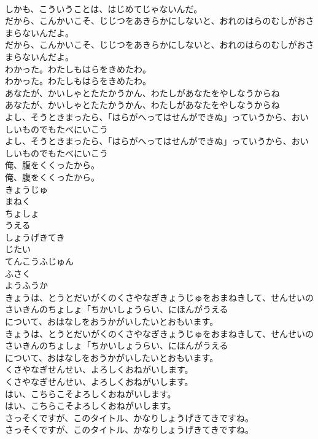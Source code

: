 \documentclass[8pt]{extreport}
\begin{document}
\begin{CJK}{UTF8}{min}
\\	しかも、こういうことは、はじめてじゃないんだ。
\\	だから、こんかいこそ、じじつをあきらかにしないと、おれのはらのむしがおさまらないんだよ。
\\	だから、こんかいこそ、じじつをあきらかにしないと、おれのはらのむしがおさまらないんだよ。
\\	わかった。わたしもはらをきめたわ。
\\	わかった。わたしもはらをきめたわ。
\\	あなたが、かいしゃとたたかうかん、わたしがあなたをやしなうからね
\\	あなたが、かいしゃとたたかうかん、わたしがあなたをやしなうからね
\\	よし、そうときまったら、「はらがへってはせんができぬ」っていうから、おいしいものでもたべにいこう
\\	よし、そうときまったら、「はらがへってはせんができぬ」っていうから、おいしいものでもたべにいこう
\\	俺、腹をくくったから。
\\	俺、腹をくくったから。
\\	きょうじゅ
\\	まねく
\\	ちょしょ
\\	うえる
\\	しょうげきてき
\\	じたい
\\	てんこうふじゅん
\\	ふさく
\\	ようふうか
\\	きょうは、とうとだいがくのくさやなぎきょうじゅをおまねきして、せんせいのさいきんのちょしょ「ちかいしょうらい、にほんがうえる
\\	について、おはなしをおうかがいしたいとおもいます。
\\	きょうは、とうとだいがくのくさやなぎきょうじゅをおまねきして、せんせいのさいきんのちょしょ「ちかいしょうらい、にほんがうえる
\\	について、おはなしをおうかがいしたいとおもいます。
\\	くさやなぎせんせい、よろしくおねがいします。
\\	くさやなぎせんせい、よろしくおねがいします。
\\	はい、こちらこそよろしくおねがいします。
\\	はい、こちらこそよろしくおねがいします。
\\	さっそくですが、このタイトル、かなりしょうげきてきですね。
\\	さっそくですが、このタイトル、かなりしょうげきてきですね。

\end{CJK}
\end{document}
